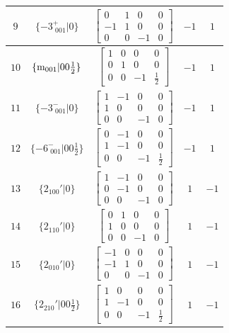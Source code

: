 \documentclass[fleqn,8pt]{jsarticle}
\begin{document}
\begin{longtable}{ccccc}
$ 9 $ & $ \{-3^{+}_{\,\,001}|0\} $ & $ \begin{bmatrix} 0 & 1 & 0 & 0 \\ -1 & 1 & 0 & 0 \\ 0 & 0 & -1 & 0 \end{bmatrix} $ & $ -1 $ & $ 1 $ \\ \hline
$ 10 $ & $ \{{\rm m}_{001}|0 0 \frac{1}{2}\} $ & $ \begin{bmatrix} 1 & 0 & 0 & 0 \\ 0 & 1 & 0 & 0 \\ 0 & 0 & -1 & \frac{1}{2} \end{bmatrix} $ & $ -1 $ & $ 1 $ \\ \hline
$ 11 $ & $ \{-3^{-}_{\,\,001}|0\} $ & $ \begin{bmatrix} 1 & -1 & 0 & 0 \\ 1 & 0 & 0 & 0 \\ 0 & 0 & -1 & 0 \end{bmatrix} $ & $ -1 $ & $ 1 $ \\ \hline
$ 12 $ & $ \{-6^{-}_{\,\,001}|0 0 \frac{1}{2}\} $ & $ \begin{bmatrix} 0 & -1 & 0 & 0 \\ 1 & -1 & 0 & 0 \\ 0 & 0 & -1 & \frac{1}{2} \end{bmatrix} $ & $ -1 $ & $ 1 $ \\ \hline
$ 13 $ & $ \{2{}_{100}{}'|0\} $ & $ \begin{bmatrix} 1 & -1 & 0 & 0 \\ 0 & -1 & 0 & 0 \\ 0 & 0 & -1 & 0 \end{bmatrix} $ & $ 1 $ & $ -1 $ \\ \hline
$ 14 $ & $ \{2{}_{110}{}'|0\} $ & $ \begin{bmatrix} 0 & 1 & 0 & 0 \\ 1 & 0 & 0 & 0 \\ 0 & 0 & -1 & 0 \end{bmatrix} $ & $ 1 $ & $ -1 $ \\ \hline
$ 15 $ & $ \{2{}_{010}{}'|0\} $ & $ \begin{bmatrix} -1 & 0 & 0 & 0 \\ -1 & 1 & 0 & 0 \\ 0 & 0 & -1 & 0 \end{bmatrix} $ & $ 1 $ & $ -1 $ \\ \hline
$ 16 $ & $ \{2{}_{210}{}'|0 0 \frac{1}{2}\} $ & $ \begin{bmatrix} 1 & 0 & 0 & 0 \\ 1 & -1 & 0 & 0 \\ 0 & 0 & -1 & \frac{1}{2} \end{bmatrix} $ & $ 1 $ & $ -1 $ \\ \hline

\end{longtable}
\end{document}
